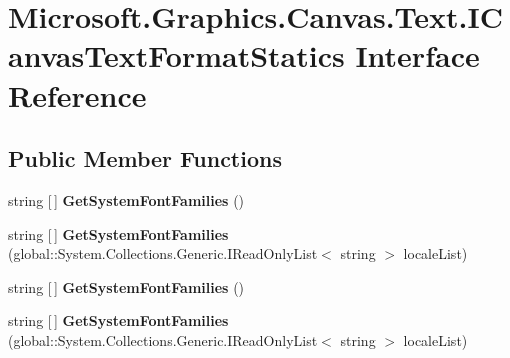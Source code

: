 \hypertarget{interface_microsoft_1_1_graphics_1_1_canvas_1_1_text_1_1_i_canvas_text_format_statics}{}\section{Microsoft.\+Graphics.\+Canvas.\+Text.\+I\+Canvas\+Text\+Format\+Statics Interface Reference}
\label{interface_microsoft_1_1_graphics_1_1_canvas_1_1_text_1_1_i_canvas_text_format_statics}
\subsection*{Public Member Functions}
\begin{DoxyCompactItemize}
\item 
\mbox{\label{interface_microsoft_1_1_graphics_1_1_canvas_1_1_text_1_1_i_canvas_text_format_statics_a38383b6acac623c98fc1c00c699dd78d}} 
string \mbox{[}$\,$\mbox{]} {\bfseries Get\+System\+Font\+Families} ()
\item 
\mbox{\label{interface_microsoft_1_1_graphics_1_1_canvas_1_1_text_1_1_i_canvas_text_format_statics_af6596d230c097943c7738a65379972d8}} 
string \mbox{[}$\,$\mbox{]} {\bfseries Get\+System\+Font\+Families} (global\+::\+System.\+Collections.\+Generic.\+I\+Read\+Only\+List$<$ string $>$ locale\+List)
\item 
\mbox{\label{interface_microsoft_1_1_graphics_1_1_canvas_1_1_text_1_1_i_canvas_text_format_statics_a38383b6acac623c98fc1c00c699dd78d}} 
string \mbox{[}$\,$\mbox{]} {\bfseries Get\+System\+Font\+Families} ()
\item 
\mbox{\label{interface_microsoft_1_1_graphics_1_1_canvas_1_1_text_1_1_i_canvas_text_format_statics_af6596d230c097943c7738a65379972d8}} 
string \mbox{[}$\,$\mbox{]} {\bfseries Get\+System\+Font\+Families} (global\+::\+System.\+Collections.\+Generic.\+I\+Read\+Only\+List$<$ string $>$ locale\+List)

\end{DoxyCompactItemize}
